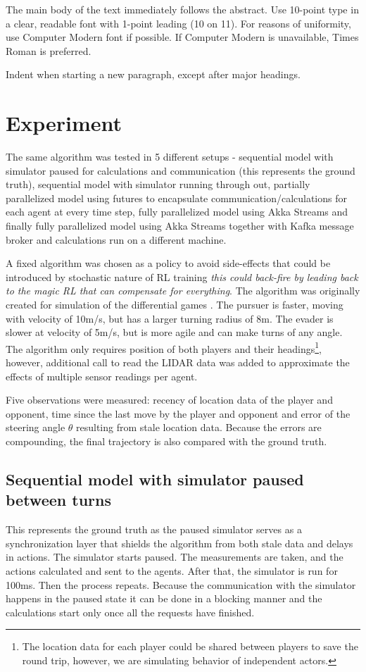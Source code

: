 \documentclass{article}
\begin{document}
The main body of the text immediately follows the abstract. 
Use 10-point type in a clear, readable font with 1-point leading (10 on
11).  For reasons of uniformity, use Computer Modern font if possible.  If
Computer Modern is unavailable, Times Roman is preferred.

Indent when starting a new paragraph, except after major headings.

\section{Experiment}
The same algorithm was tested in 5 different setups - sequential model with simulator paused for calculations and communication (this represents the ground truth), sequential model with simulator running through out, partially parallelized model using futures to encapsulate communication/calculations for each agent at every time step, fully parallelized model using Akka Streams and finally fully parallelized model using Akka Streams together with Kafka message broker and calculations run on a different machine. 

A fixed algorithm was chosen as a policy to avoid side-effects that could be introduced by stochastic nature of RL training \emph{this could back-fire by leading back to the magic RL that can compensate for everything}. The algorithm was originally created for simulation of the differential games \cite{anne-paper}. The pursuer is faster, moving with velocity of 10m/s, but has a larger turning radius of 8m. The evader is slower at velocity of 5m/s, but is more agile and can make turns of any angle. The algorithm only requires position of both players and their headings\footnote{The location data for each player could be shared between players to save the round trip, however, we are simulating behavior of independent actors.}, however, additional call to read the LIDAR data was added to approximate the effects of multiple sensor readings per agent.

Five observations were measured: recency of location data of the player and opponent, time since the last move by the player and opponent and error of the steering angle $\theta$ resulting from stale location data. Because the errors are compounding, the final trajectory is also compared with the ground truth.

\subsection{Sequential model with simulator paused between turns}
This represents the ground truth as the paused simulator serves as a synchronization layer that shields the algorithm from both stale data and delays in actions. The simulator starts paused. The measurements are taken, and the actions calculated and sent to the agents. After that, the simulator is run for 100ms. Then the process repeats. Because the communication with the simulator happens in the paused state it can be done in a blocking manner and the calculations start only once all the requests have finished.
\end{document}
